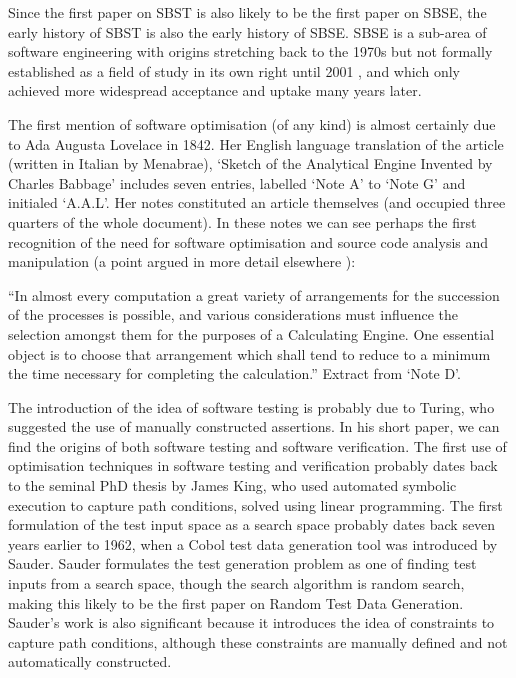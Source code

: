 \documentclass[conference]{IEEEtran}
\begin{document}
Since the first paper on SBST is also likely to be the first
paper on SBSE, the early history of SBST is also the early
history of SBSE. SBSE is a sub-area of software engineering
with origins stretching back to the 1970s but not formally
established as a field of study in its own right until 2001
, and which only achieved more widespread acceptance
and uptake many years later.

The first mention of software optimisation (of any kind) is
almost certainly due to Ada Augusta Lovelace in 1842. Her
English language translation of the article (written in Italian
by Menabrae), ‘Sketch of the Analytical Engine Invented
by Charles Babbage’ includes seven entries, labelled ‘Note
A’ to ‘Note G’ and initialed ‘A.A.L’. Her notes constituted
an article themselves (and occupied three quarters of the
whole document). In these notes we can see perhaps the first
recognition of the need for software optimisation and source
code analysis and manipulation (a point argued in more detail
elsewhere \cite{5601835}):

“In almost every computation a great variety of
arrangements for the succession of the processes is
possible, and various considerations must influence
the selection amongst them for the purposes of
a Calculating Engine. One essential object is to
choose that arrangement which shall tend to reduce
to a minimum the time necessary for completing the
calculation.” Extract from ‘Note D’.

The introduction of the idea of software testing is probably
due to Turing, who suggested the use of manually
constructed assertions. In his short paper, we can find the
origins of both software testing and software verification. The
first use of optimisation techniques in software testing and
verification probably dates back to the seminal PhD thesis
by James King, who used automated symbolic execution
to capture path conditions, solved using linear programming.
The first formulation of the test input space as a search
space probably dates back seven years earlier to 1962, when
a Cobol test data generation tool was introduced by Sauder. 
Sauder formulates the test generation problem as one
of finding test inputs from a search space, though the search
algorithm is random search, making this likely to be the first
paper on Random Test Data Generation. Sauder’s work is
also significant because it introduces the idea of constraints
to capture path conditions, although these constraints are
manually defined and not automatically constructed.
\end{document}

